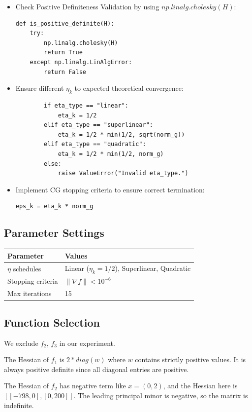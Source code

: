 \documentclass[12pt]{article}
\begin{document}
\begin{itemize}
    \item Check Positive Definiteness Validation by using $np.linalg.cholesky(H)$:
\begin{lstlisting}
def is_positive_definite(H):
    try:
        np.linalg.cholesky(H)
        return True
    except np.linalg.LinAlgError:
        return False
\end{lstlisting}
    \item Ensure different $\eta_k$ to expected theoretical convergence:
\begin{lstlisting}
        if eta_type == "linear":
            eta_k = 1/2 
        elif eta_type == "superlinear":
            eta_k = 1/2 * min(1/2, sqrt(norm_g))
        elif eta_type == "quadratic":
            eta_k = 1/2 * min(1/2, norm_g)
        else:
            raise ValueError("Invalid eta_type.")
\end{lstlisting}
    \item Implement CG stopping criteria to ensure correct termination:
\begin{lstlisting}
eps_k = eta_k * norm_g
\end{lstlisting}
\end{itemize}

\subsection{Parameter Settings}
\begin{tabular}{ll}
    \toprule
    Parameter & Values \\ 
    \midrule
    $\eta$ schedules & Linear ($\eta_k = 1/2$), Superlinear, Quadratic \\
    Stopping criteria & $\|\nabla f\| < 10^{-6}$ \\
    Max iterations & 15 \\
    \bottomrule
\end{tabular}

\subsection{Function Selection}
We exclude $f_2$, $f_3$ in our experiment. 

The Hessian of $f_1$ is $2*diag(w)$ where $w$ contains strictly positive values. It is always positive definite since all diagonal entries are positive.

The Hessian of $f_2$ has negative term like $x=(0,2)$, and the Hessian here is $[[-798, 0], [0, 200]]$. The leading principal minor is negative, so the matrix is indefinite. 
\end{document}
